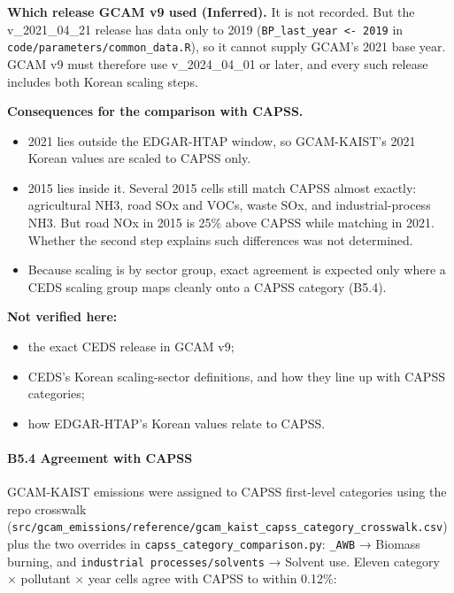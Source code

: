 \textbf{Which release GCAM v9 used (Inferred).} It is not recorded. But the
v\_2021\_04\_21 release has data only to 2019
(\texttt{BP\_\allowbreak{}last\_\allowbreak{}year <- 2019} in
\texttt{code/\allowbreak{}parameters/\allowbreak{}common\_\allowbreak{}data.\allowbreak{}R}),
so it cannot supply GCAM's 2021 base year. GCAM v9 must therefore use
v\_2024\_04\_01 or later, and every such release includes both Korean scaling
steps.

\textbf{Consequences for the comparison with CAPSS.}

\begin{itemize}
\tightlist
\item
  2021 lies outside the EDGAR-HTAP window, so GCAM-KAIST's 2021 Korean values
  are scaled to CAPSS only.
\item
  2015 lies inside it. Several 2015 cells still match CAPSS almost exactly:
  agricultural NH3, road SOx and VOCs, waste SOx, and industrial-process NH3. But
  road NOx in 2015 is 25\% above CAPSS while matching in 2021. Whether the second
  step explains such differences was not determined.
\item
  Because scaling is by sector group, exact agreement is expected only where a
  CEDS scaling group maps cleanly onto a CAPSS category (B5.4).
\end{itemize}

\textbf{Not verified here:}

\begin{itemize}
\tightlist
\item
  the exact CEDS release in GCAM v9;
\item
  CEDS's Korean scaling-sector definitions, and how they line up with CAPSS
  categories;
\item
  how EDGAR-HTAP's Korean values relate to CAPSS.
\end{itemize}

\hypertarget{b5.4-agreement-with-capss}{%
\paragraph{B5.4
Agreement
with
CAPSS}\label{b5.4-agreement-with-capss}}

GCAM-KAIST
emissions
were
assigned
to CAPSS
first-level
categories
using the
repo
crosswalk
(\texttt{src/\allowbreak{}gcam\_\allowbreak{}emissions/\allowbreak{}reference/\allowbreak{}gcam\_\allowbreak{}kaist\_\allowbreak{}capss\_\allowbreak{}category\_\allowbreak{}crosswalk.\allowbreak{}csv})
plus the
two
overrides
in
\texttt{capss\_\allowbreak{}category\_\allowbreak{}comparison.\allowbreak{}py}:
\texttt{\_\allowbreak{}AWB}
→ Biomass
burning,
and
\texttt{industrial\ processes/\allowbreak{}solvents}
→ Solvent
use.
Eleven
category ×
pollutant
× year
cells
agree with
CAPSS to
within
0.12\%:

